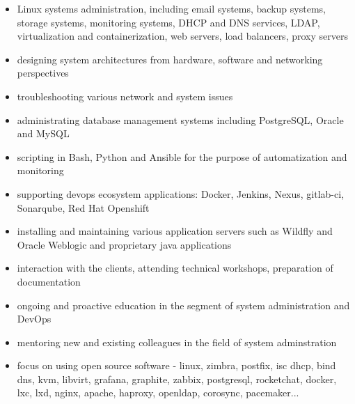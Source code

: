 \documentclass{cv}
\begin{document}
\begin{itemize}
    \setlength\itemsep{0.1cm}
    \item Linux systems administration, including email systems, backup systems, storage systems, monitoring systems, DHCP and DNS services, LDAP, virtualization and containerization, web servers, load balancers, proxy servers
    \item designing system architectures from hardware, software and networking perspectives
    \item troubleshooting various network and system issues 
    \item administrating database management systems including PostgreSQL, Oracle and MySQL
    \item scripting in Bash, Python and Ansible for the purpose of automatization and monitoring
    \item supporting devops ecosystem applications: Docker, Jenkins, Nexus, gitlab-ci, Sonarqube, Red Hat Openshift
    \item installing and maintaining various application servers such as Wildfly and Oracle Weblogic and proprietary java applications
    \item interaction with the clients, attending technical workshops, preparation of documentation
    \item ongoing and proactive education in the segment of system administration and DevOps
    \item mentoring new and existing colleagues in the field of system adminstration
    \item focus on using open source software - linux, zimbra, postfix, isc dhcp, bind dns, kvm, libvirt, grafana, graphite, zabbix, postgresql, rocketchat, docker, lxc, lxd, nginx, apache, haproxy, openldap, corosync, pacemaker...
\end{itemize}
\end{document}
